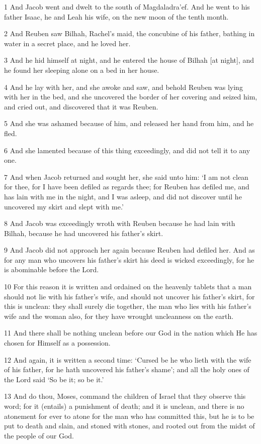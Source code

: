 \par 1 And Jacob went and dwelt to the south of Magdaladra'ef. And he went to his father Isaac, he and Leah his wife, on the new moon of the tenth month.
\par 2 And Reuben saw Bilhah, Rachel's maid, the concubine of his father, bathing in water in a secret place, and he loved her.
\par 3 And he hid himself at night, and he entered the house of Bilhah [at night], and he found her sleeping alone on a bed in her house.
\par 4 And he lay with her, and she awoke and saw, and behold Reuben was lying with her in the bed, and she uncovered the border of her covering and seized him, and cried out, and discovered that it was Reuben.
\par 5 And she was ashamed because of him, and released her hand from him, and he fled.
\par 6 And she lamented because of this thing exceedingly, and did not tell it to any one.
\par 7 And when Jacob returned and sought her, she said unto him: ‘I am not clean for thee, for I have been defiled as regards thee; for Reuben has defiled me, and has lain with me in the night, and I was asleep, and did not discover until he uncovered my skirt and slept with me.’
\par 8 And Jacob was exceedingly wroth with Reuben because he had lain with Bilhah, because he had uncovered his father's skirt.
\par 9 And Jacob did not approach her again because Reuben had defiled her. And as for any man who uncovers his father's skirt his deed is wicked exceedingly, for he is abominable before the Lord.
\par 10 For this reason it is written and ordained on the heavenly tablets that a man should not lie with his father's wife, and should not uncover his father's skirt, for this is unclean: they shall surely die together, the man who lies with his father's wife and the woman also, for they have wrought uncleanness on the earth.
\par 11 And there shall be nothing unclean before our God in the nation which He has chosen for Himself as a possession.
\par 12 And again, it is written a second time: ‘Cursed be he who lieth with the wife of his father, for he hath uncovered his father's shame’; and all the holy ones of the Lord said ‘So be it; so be it.’
\par 13 And do thou, Moses, command the children of Israel that they observe this word; for it (entails) a punishment of death; and it is unclean, and there is no atonement for ever to atone for the man who has committed this, but he is to be put to death and slain, and stoned with stones, and rooted out from the midst of the people of our God.
